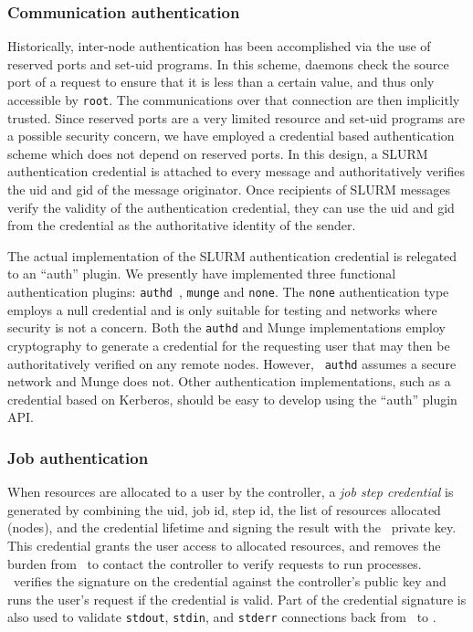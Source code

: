 \documentclass[10pt,onecolumn,times]{../common/llncs}
\begin{document}
{\subsubsection{Communication authentication}

Historically, inter-node authentication has been accomplished via the use
of reserved ports and set-uid programs. In this scheme, daemons check the
source port of a request to ensure that it is less than a certain value,
and thus only accessible by {\tt root}. The communications over that
connection are then implicitly trusted.  Since reserved ports are a very
limited resource and set-uid programs are a possible security concern,
we have employed a credential based authentication scheme which
does not depend on reserved ports. In this design, a SLURM authentication
credential is attached to every message and authoritatively verifies the
uid and gid of the message originator. Once recipients of SLURM messages
verify the validity of the authentication credential, they can use the uid
and gid from the credential as the authoritative identity of the sender.

The actual implementation of the SLURM authentication credential is
relegated to an ``auth'' plugin.  We presently have implemented three
functional authentication plugins: {\tt authd}~\cite{Authd2002}, 
{\tt munge} and {\tt none}.  The {\tt none} authentication type employs a null
credential and is only suitable for testing and networks where security
is not a concern. Both the {\tt authd} and Munge implementations employ
cryptography to generate a credential for the requesting user that
may then be authoritatively verified on any remote nodes. However, {\tt
authd} assumes a secure network and Munge does not.  Other authentication
implementations, such as a credential based on Kerberos, should be easy
to develop using the ``auth'' plugin API.

\subsubsection{Job authentication}

When resources are allocated to a user by the controller, a {\em job step
credential} is generated by combining the uid, job id, step id, the list
of resources allocated (nodes), and the credential lifetime and signing
the result with the \slurmctld\ private key.  This credential grants the
user access to allocated resources, and removes the burden from \slurmd\
to contact the controller to verify requests to run processes. \slurmd\
verifies the signature on the credential against the controller's public
key and runs the user's request if the credential is valid.  Part of the
credential signature is also used to validate {\tt stdout}, {\tt stdin},
and {\tt stderr} connections back from \slurmd\ to \srun .

}
\end{document}
